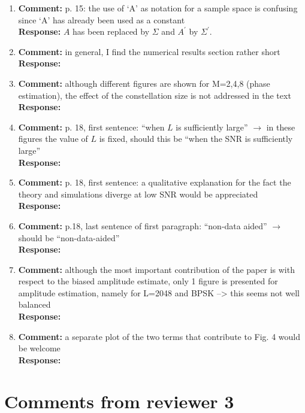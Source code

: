 \documentclass{article}
\begin{document}
\begin{enumerate}
\item \textbf{Comment:} p. 15: the use of `A' as notation for a sample space is confusing since `A' has already been used as a constant \\
\textbf{Response:} $A$ has been replaced by $\Sigma$ and $A^\prime$ by $\Sigma^\prime$.


\item \textbf{Comment:} in general, I find the numerical results section rather short \\
\textbf{Response:}

\item \textbf{Comment:} although different figures are shown for M=2,4,8 (phase estimation), the effect of the constellation size is not addressed in the text  \\
\textbf{Response:}

\item \textbf{Comment:} p. 18, first sentence: ``when $L$ is sufficiently large'' $\to$ in these figures the value of $L$ is fixed, should this be ``when the SNR is sufficiently large''  \\
\textbf{Response:}

\item \textbf{Comment:} p. 18, first sentence: a qualitative explanation for the fact the theory and simulations diverge at low SNR would be appreciated  \\
\textbf{Response:}

\item \textbf{Comment:} p.18, last sentence of first paragraph: ``non-data aided'' $\to$ should be ``non-data-aided''  \\
\textbf{Response:}

\item \textbf{Comment:}  although the most important contribution of the paper is with respect to the biased amplitude estimate, only 1 figure is presented for amplitude estimation, namely for L=2048 and BPSK --> this seems not well balanced  \\
\textbf{Response:}

\item \textbf{Comment:}  a separate plot of the two terms that contribute to Fig. 4 would be welcome \\
\textbf{Response:}

\end{enumerate}

\section{Comments from reviewer 3}
\end{document}
